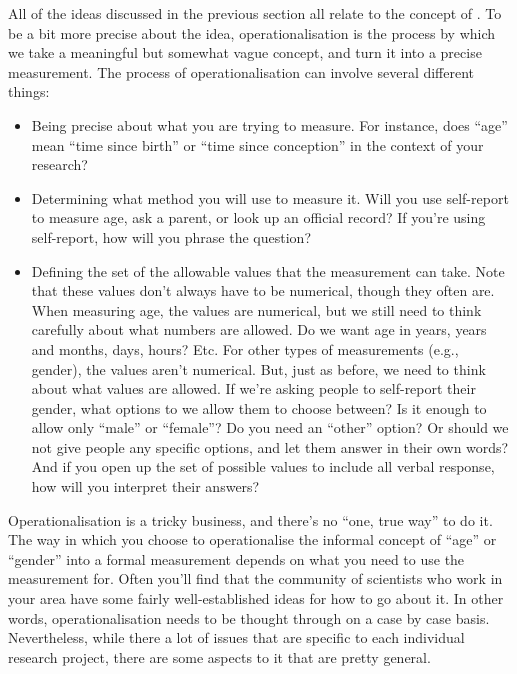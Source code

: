 
All of the ideas discussed in the previous section all relate to the concept of . To be a bit more precise about the idea, operationalisation is the process by which we take a meaningful but somewhat vague concept, and turn it into a precise measurement. The process of operationalisation can involve several different things:

\begin{itemize}
\item Being precise about what you are trying to measure. For instance, does ``age'' mean ``time since birth'' or ``time since conception'' in the context of your research?
\item Determining what method you will use to measure it. Will you use self-report to measure age, ask a parent, or look up an official record? If you're using self-report, how will you phrase the question? 
\item Defining the set of the allowable values that the measurement can take. Note that these values don't always have to be numerical, though they often are. When measuring age, the values are numerical, but we still need to think carefully about what numbers are allowed. Do we want age in years, years and months, days, hours? Etc. For other types of measurements (e.g., gender), the values aren't numerical. But, just as before, we need to think about what values are allowed. If we're asking people to self-report their gender, what options to we allow them to choose between? Is it enough to allow only ``male'' or ``female''? Do you need an ``other'' option? Or should we not give people any specific options, and let them answer in their own words? And if you open up the set of possible values to include all verbal response, how will you interpret their answers?
\end{itemize}
 
Operationalisation is a tricky business, and there's no ``one, true way'' to do it. The way in which you choose to operationalise the informal concept of ``age'' or ``gender'' into a formal measurement depends on what you need to use the measurement for. Often you'll find that the community of scientists who work in your area have some fairly well-established ideas for how to go about it. In other words, operationalisation needs to be thought through on a case by case basis. Nevertheless, while there a lot of issues that are specific to each individual research project, there are some aspects to it that are pretty general. 

